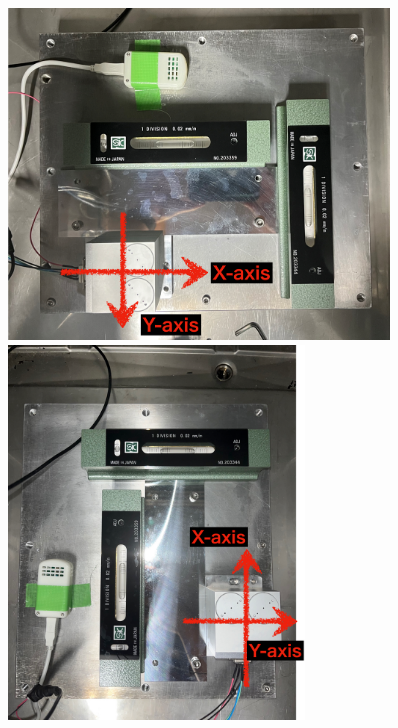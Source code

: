 \documentclass[../../main.tex]{subfiles}
\begin{document}
\begin{figure}[H]
    \begin{minipage}[b]{0.45\columnwidth}
        \centering
        \includegraphics[width=0.9\textwidth]{tiltsensor/evalu_kyoto1.pdf}
        \subcaption{}
        \label{fig:evaluation_kyoto1}
        \centering
        \includegraphics[width=0.7\textwidth]{tiltsensor/evalu_kyoto2.pdf}
        \subcaption{}
        \label{fig:evaluation_kyoto2}
    \end{minipage}
    \hspace{0.005\columnwidth}

\end{figure}
\end{document}
